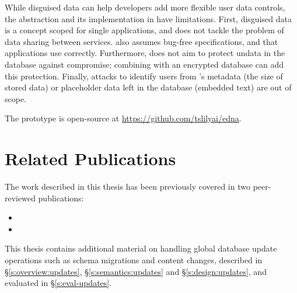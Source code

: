 %
While disguised data can help developers add more flexible user data
controls, the abstraction and its implementation in \sys have limitations. 
%
First, disguised data is a concept scoped for single applications, and does not
tackle the problem of data sharing between services.
%
%
\sys also assumes bug-free \xx specifications, and that applications use \sys
correctly.
%
Furthermore, \sys does not aim to protect un\xxed data in the database against compromise;
combining \sys with an encrypted database can add this protection.
%
Finally, attacks to identify users from \sys's metadata (\eg the size of
stored \xxed data) or placeholder data left in the database (\eg embedded text)
are out of scope.
%

The \sys prototype is open-source at \url{https://github.com/tslilyai/edna}.

\section{Related Publications}
The work described in this thesis has been previously covered in two
peer-reviewed publications:

\begin{itemize}
    \item {}
    \item {}
\end{itemize}
%
This thesis contains additional material on handling global database update
operations such as schema migrations and content changes, described in
\S\ref{s:overview:updates}, \S\ref{s:semantics:updates} and \S\ref{s:design:updates}, and evaluated
in \S\ref{s:eval-updates}.

\iffalse
\section{Remaining Work: Revealing with Schema Migrations and Application
Updates}

In \sys's current design, \textbf{global database updates} that implicitly enforce
invariants on application data remain unknown (and thus uncheckable) by \sys.
\sys also fails to reveal disguised data affected by \textbf{schema migrations}
performed since the time of disguise.
%
We will add an API for developers to log important updates and schema migrations with \sys, which \sys will apply to disguised data prior to restoring it to the database.

\sys will apply these updates or schema migrations prior to performing \sys's
existing consistency checks; these checks enable \sys to detect if revealing
transformations will violate referential integrity or other structural database
invariants (\eg uniqueness requirements). 

\fi
